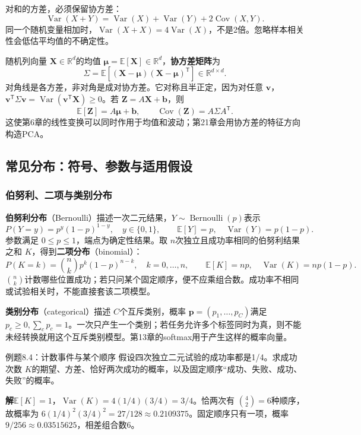 \documentclass[UTF8,fontset=none,zihao=-4,a4paper]{ctexart}
\newcommand{\term}[1]{\textbf{#1}}
\newcommand{\sol}{\par\noindent\textbf{解}\quad}
\numberwithin{equation}{section}
\numberwithin{figure}{section}
\begin{document}
对和的方差，必须保留协方差：
\[
 \operatorname{Var}(X+Y)=\operatorname{Var}(X)+\operatorname{Var}(Y)+2\operatorname{Cov}(X,Y).
\]
同一个随机变量相加时，$\operatorname{Var}(X+X)=4\operatorname{Var}(X)$，不是2倍。忽略样本相关性会低估平均值的不确定性。

随机列向量 $\symbf X\in\mathbb R^d$的均值 $\symbf\mu=\mathbb E[\symbf X]\in\mathbb R^d$，\term{协方差矩阵}为
\[
 \Sigma=\mathbb E[(\symbf X-\symbf\mu)(\symbf X-\symbf\mu)^{\mathsf T}]
 \in\mathbb R^{d\times d}.
\]
对角线是各方差，非对角是成对协方差。它对称且半正定，因为对任意 $\symbf v$，$\symbf v^{\mathsf T}\Sigma\symbf v=\operatorname{Var}(\symbf v^{\mathsf T}\symbf X)\ge0$。若 $\symbf Z=A\symbf X+\symbf b$，则
\[
 \mathbb E[\symbf Z]=A\symbf\mu+\symbf b,\qquad
 \operatorname{Cov}(\symbf Z)=A\Sigma A^{\mathsf T}.
\]
这使第6章的线性变换可以同时作用于均值和波动；第21章会用协方差的特征方向构造PCA。

\subsection{常见分布：符号、参数与适用假设}
\subsubsection{伯努利、二项与类别分布}
\term{伯努利分布}（Bernoulli）描述一次二元结果，$Y\sim\operatorname{Bernoulli}(p)$表示
\[
 P(Y=y)=p^y(1-p)^{1-y},\quad y\in\{0,1\},\qquad
 \mathbb E[Y]=p,\quad\operatorname{Var}(Y)=p(1-p).
\]
参数满足 $0\le p\le1$，端点为确定性结果。取 $n$次独立且成功率相同的伯努利结果之和 $K$，得到\term{二项分布}（binomial）：
\[
 P(K=k)=\binom nkp^k(1-p)^{n-k},\quad k=0,\ldots,n,
 \qquad \mathbb E[K]=np,\quad\operatorname{Var}(K)=np(1-p).
\]
$\binom nk$计数哪些位置成功；若只问某个固定顺序，便不应乘组合数。成功率不相同或试验相关时，不能直接套该二项模型。

\term{类别分布}（categorical）描述 $C$个互斥类别，概率 $\symbf p=(p_1,\ldots,p_C)$满足 $p_c\ge0,\sum_cp_c=1$。一次只产生一个类别；若任务允许多个标签同时为真，则不能未经转换就用这个互斥类别模型。第13章的softmax用于产生这样的概率向量。

\begin{infobox}{例题8.4：计数事件与某个顺序}
假设四次独立二元试验的成功率都是1/4。求成功次数 $K$的期望、方差、恰好两次成功的概率，以及固定顺序“成功、失败、成功、失败”的概率。
\end{infobox}
\sol $\mathbb E[K]=1$，$\operatorname{Var}(K)=4(1/4)(3/4)=3/4$。恰两次有 $\binom42=6$种顺序，故概率为 $6(1/4)^2(3/4)^2=27/128\approx0.2109375$。固定顺序只有一项，概率 $9/256\approx0.03515625$，相差组合数6。
\end{document}
